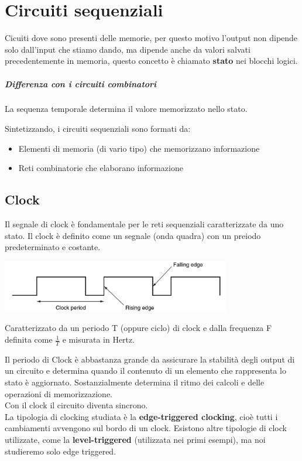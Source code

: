 \documentclass[12pt, a4paper, openany]{book}
\begin{document}
\chapter{Circuiti sequenziali}
Cicuiti dove sono presenti delle memorie, per questo motivo l'output non dipende
solo dall'input che stiamo dando, ma dipende anche da valori salvati precedentemente in memoria,
questo concetto è chiamato \textbf{stato} nei blocchi logici.

\paragraph{Differenza con i circuiti combinatori} La sequenza temporale determina il valore
memorizzato nello stato.

Sintetizzando, i circuiti sequenziali sono formati da:
\begin{itemize}
    \item Elementi di memoria (di vario tipo) che memorizzano informazione
    \item Reti combinatorie che elaborano informazione
\end{itemize}

\section{Clock}
Il segnale di clock è fondamentale per le reti sequenziali caratterizzate da uno stato.
Il clock è definito come un segnale (onda quadra) con un preiodo predeterminato e costante.
\begin{center}
    \includegraphics[width=100mm, scale=0.5]{clock_rappresentazione.png}
\end{center}
Caratterizzato da un periodo T (oppure ciclo) di clock e dalla frequenza F definita come
$\frac{1}{T}$ e misurata in Hertz.

Il periodo di Clock è abbastanza grande da assicurare la stabilità degli output di un circuito
e determina quando il contenuto di un elemento che rappresenta lo stato è aggiornato.
Sostanzialmente determina il ritmo dei calcoli e delle operazioni di memorizzazione.
\\ Con il clock il circuito diventa sincrono.
\\ La tipologia di clocking studiata è la \textbf{edge-triggered clocking}, cioè tutti i
cambiamenti avvengono sul bordo di un clock. Esistono altre tipologie di clock
utilizzate, come la \textbf{level-triggered} (utilizzata nei primi esempi), 
ma noi studieremo solo edge triggered.
\end{document}

